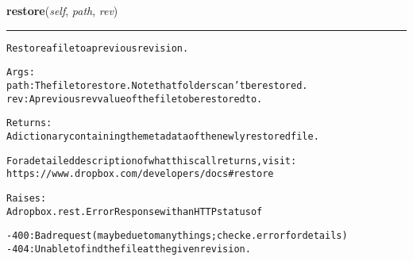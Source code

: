 \hspace{.8\funcindent}\begin{boxedminipage}{\funcwidth}

    \raggedright \textbf{restore}(\textit{self}, \textit{path}, \textit{rev})

    \vspace{-1.5ex}

    \rule{\textwidth}{0.5\fboxrule}
\setlength{\parskip}{2ex}
\begin{alltt}
Restore a file to a previous revision.

Args:
    path: The file to restore. Note that folders can't be restored.
    rev: A previous rev value of the file to be restored to.

Returns:
    A dictionary containing the metadata of the newly restored file.

    For a detailed description of what this call returns, visit:
    https://www.dropbox.com/developers/docs\#restore

Raises:
    A dropbox.rest.ErrorResponse with an HTTP status of

    - 400: Bad request (may be due to many things; check e.error for details)
    - 404: Unable to find the file at the given revision.
\end{alltt}

\setlength{\parskip}{1ex}
    \end{boxedminipage}

    \label{lib:dropbox:DropboxClient:media}

    \vspace{0.5ex}

